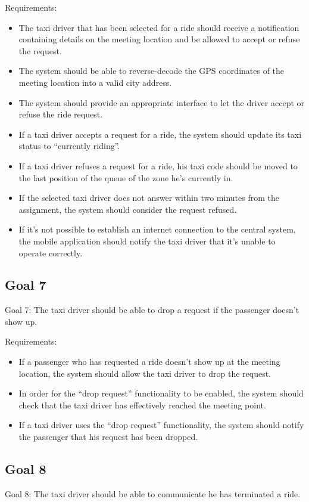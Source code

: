 \documentclass{book}
\begin{document}
Requirements:
\begin{itemize}
\item The taxi driver that has been selected for a ride should receive a notification containing details on the meeting location and be allowed to accept or refuse the request.
\item The system should be able to reverse-decode the GPS coordinates of the meeting location into a valid city address.
\item The system should provide an appropriate interface to let the driver accept or refuse the ride request.
\item If a taxi driver accepts a request for a ride, the system should update its taxi status to “currently riding”.
\item If a taxi driver refuses a request for a ride, his taxi code should be moved to the last position of the queue of the zone he’s currently in.
\item If the selected taxi driver does not answer within two minutes from the assignment, the system should consider the request refused. 
\item If it’s not possible to establish an internet connection to the central system, the mobile application should notify the taxi driver that it’s unable to operate correctly.
\end{itemize}

\subsection{Goal 7}
Goal 7: The taxi driver should be able to drop a request if the passenger doesn’t show up.

Requirements:
\begin{itemize}
\item If a passenger who has requested a ride doesn’t show up at the meeting location, the system should allow the taxi driver to drop the request. 
\item In order for the “drop request” functionality to be enabled, the system should check that the taxi driver has effectively reached the meeting point.
\item If a taxi driver uses the “drop request” functionality, the system should notify the passenger that his request has been dropped.
\end{itemize}

\subsection{Goal 8}
Goal 8: The taxi driver should be able to communicate he has terminated a ride.
\end{document}
